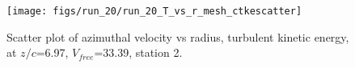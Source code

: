 \begin{figure}[H]
\centering
\texttt{[image: figs/run\_20/run\_20\_T\_vs\_r\_mesh\_ctkescatter]}
\caption{Scatter plot of azimuthal velocity vs radius, turbulent kinetic energy, at $z/c$=6.97, $V_{free}$=33.39, station 2.}
\label{fig:run_20_T_vs_r_mesh_ctkescatter}
\end{figure}


